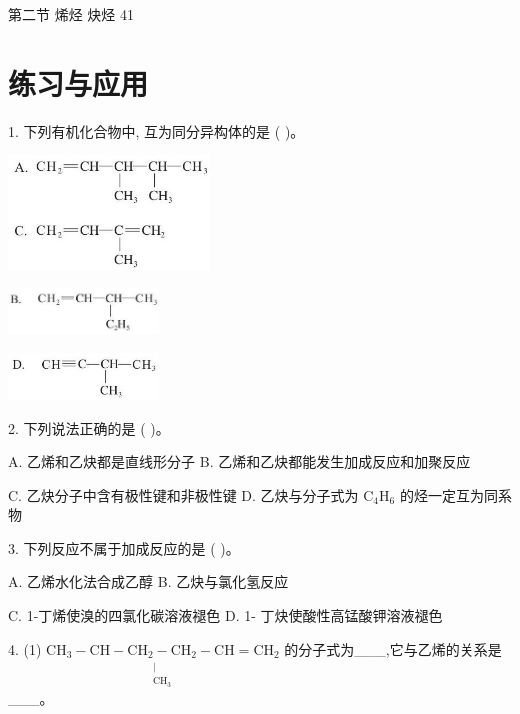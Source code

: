 \documentclass[10pt]{article}
\begin{document}
第二节 烯烃 炔烃 41

\section*{练习与应用}

1. 下列有机化合物中, 互为同分异构体的是 ( )。

\begin{center}
\includegraphics[max width=0.4\textwidth]{images/0190efc5-b58a-7c43-bfb0-e0a030df9cfd_47_350759.jpg}
\end{center}

\begin{center}
\includegraphics[max width=0.3\textwidth]{images/0190efc5-b58a-7c43-bfb0-e0a030df9cfd_47_424764.jpg}
\end{center}

\begin{center}
\includegraphics[max width=0.3\textwidth]{images/0190efc5-b58a-7c43-bfb0-e0a030df9cfd_47_765858.jpg}
\end{center}

2. 下列说法正确的是 ( )。

A. 乙烯和乙炔都是直线形分子 B. 乙烯和乙炔都能发生加成反应和加聚反应

C. 乙炔分子中含有极性键和非极性键 D. 乙炔与分子式为 \({\mathrm{C}}_{4}{\mathrm{H}}_{6}\) 的烃一定互为同系物

3. 下列反应不属于加成反应的是 ( )。

A. 乙烯水化法合成乙醇 B. 乙炔与氯化氢反应

C. 1-丁烯使溴的四氯化碳溶液褪色 D. 1- 丁炔使酸性高锰酸钾溶液褪色

4. (1) \({\mathrm{{CH}}}_{3} - \underset{\begin{matrix} | \\ {\mathrm{{CH}}}_{3} \end{matrix}}{\mathrm{{CH}} - {\mathrm{{CH}}}_{2} - {\mathrm{{CH}}}_{2} - \mathrm{{CH}}} = {\mathrm{{CH}}}_{2}\) 的分子式为\_\_\_,它与乙烯的关系是 \_\_\_。
\end{document}
